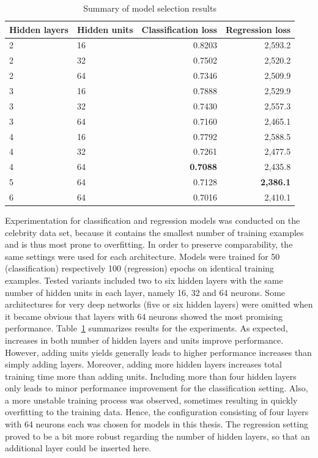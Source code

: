 \begin{table}
\begin{tabular}{llrr}
\toprule
Hidden layers & Hidden units & Classification loss & Regression loss \\
\midrule
2 & 16 & 0.8203 & 2,593.2 \\
2 & 32 & 0.7502 & 2,520.2 \\
2 & 64 & 0.7346 & 2,509.9 \\
3 & 16 & 0.7888 & 2,529.9 \\
3 & 32 & 0.7430 & 2,557.3 \\
3 & 64 & 0.7160 & 2,465.1 \\
4 & 16 & 0.7792 & 2,588.5 \\
4 & 32 & 0.7261 & 2,477.5 \\
4 & 64 & \textbf{0.7088} & 2,435.8 \\
5 & 64 & 0.7128 & \textbf{2,386.1} \\
6 & 64 & 0.7016 & 2,410.1 \\
\bottomrule
\end{tabular}
\caption{Summary of model selection results}
\label{tab:dm1_selection_results}
\end{table}

Experimentation for classification and regression models was conducted on the
celebrity data set, because it contains the smallest number of training examples
and is thus most prone to overfitting.
In order to preserve comparability, the same settings were used for each architecture.
Models were trained for 50 (classification) respectively 100 (regression) epochs
on identical training examples.
Tested variants included two to six hidden layers with the same number of hidden
units in each layer, namely 16, 32 and 64 neurons.
Some architectures for very deep networks (five or six hidden layers) were omitted
when it became obvious that layers with 64 neurons showed the most promising
performance.
Table~\ref{tab:dm1_selection_results} summarizes results for the experiments.
As expected, increases in both number of hidden layers and units improve
performance.
However, adding units yields generally leads to higher performance increases than
simply adding layers.
Moreover, adding more hidden layers increases total training time more than
adding units.
Including more than four hidden layers only leads to minor performance improvement for
the classification setting.
Also, a more unstable training process was observed, sometimes resulting in quickly overfitting
to the training data.
Hence, the configuration consisting of four layers with 64 neurons each was
chosen for models in this thesis.
The regression setting proved to be a bit more robust regarding the number of
hidden layers, so that an additional layer could be inserted here.

